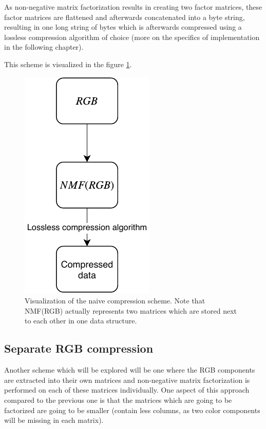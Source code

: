 \documentclass[thesis=M,english]{FITthesis}[2012/10/20]
\begin{document}
As non-negative matrix factorization results in creating two factor
matrices, these factor matrices are flattened and afterwards concatenated into
a byte string, resulting in one long string of bytes which is afterwards
compressed using a lossless compression algorithm of choice (more on the specifics of
implementation in the following chapter).

This scheme is visualized in the figure \ref{fig:nmf-naive-scheme}.

\begin{figure}[h]
  \centering
  \includegraphics{imgs/nmf-naive-scheme}
  \caption[Visualization of the naive compression scheme]{Visualization of the naive compression scheme. Note that NMF(RGB) actually
  represents two matrices which are stored next to each other in one data structure.}
  \label{fig:nmf-naive-scheme}
\end{figure}

\subsection{Separate RGB compression}
Another scheme which will be explored will be one where the RGB components
are extracted into their own matrices and non-negative matrix factorization
is performed on each of these matrices individually. One aspect of this approach
compared to the previous one is that the matrices which are going to be factorized
are going to be smaller (contain less columns, as two color components will be missing
in each matrix).
\end{document}
